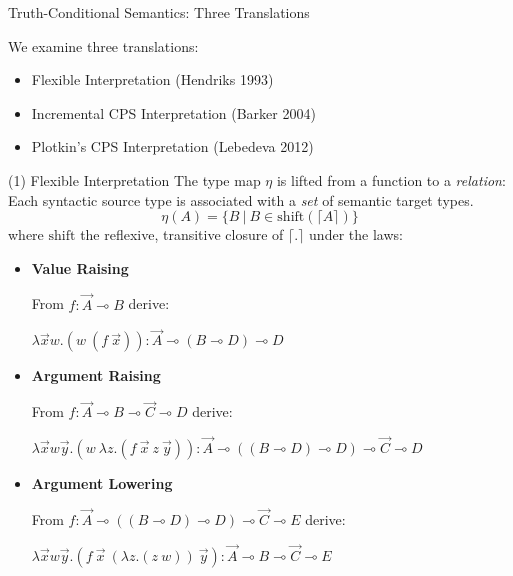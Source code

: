 \documentclass{beamer}
\newcommand{\li}{\!\multimap\!}
\newcommand{\trans}[1]{\lceil #1 \rceil}
\begin{document}
\begin{frame}{Truth-Conditional Semantics: Three Translations}
	
	We examine three translations:
	\begin{itemize}
	\item Flexible Interpretation (Hendriks 1993)
	\item Incremental CPS Interpretation (Barker 2004)
	\item Plotkin's CPS Interpretation (Lebedeva 2012)
	\end{itemize}
\end{frame}

\begin{frame}{(1) Flexible Interpretation}
	\small
	The type map $\eta$ is lifted from a function to a \textit{relation}:
	Each syntactic source type is associated with a \textit{set} of semantic target types.
	\[
		\eta(A) = \{ B \ | \ B \in \mathrm{shift}(\trans{A}) \}
	\]
	where $\mathrm{shift}$ the reflexive, transitive closure of $\trans{.}$ under the laws:
	\begin{itemize}
		\item \textbf{Value Raising}
			{\footnotesize
			\begin{flushleft}
			From $f: \vec{A}\li B$ derive:
			\end{flushleft}
			\begin{flushright}
			\vspace{-10pt}
			$\lambda \vec{x}w.(w \ (f \ \vec{x})): \vec{A} \li (B\li D) \li D$		
			\end{flushright}
			}
		\item \textbf{Argument Raising}
			{\footnotesize
			\begin{flushleft}
			From $f: \vec{A}\li B \li \vec{C}\li D$ derive:
			\end{flushleft}
			\begin{flushright}
			\vspace{-10pt}
			$\lambda \vec{x}w\vec{y}.(w \ \lambda z.(f \ \vec{x} \ z \ \vec{y})): \vec{A}\li ((B\li D)\li D) \li \vec{C} \li D$
			\end{flushright}
			}
		\item \textbf{Argument Lowering}
			{\footnotesize
			\begin{flushleft}
			 From $f: \vec{A} \li ((B\li D) \li D) \li \vec{C} \li E$ derive:		
			\end{flushleft}
			\begin{flushright}
			\vspace{-10pt}
			$\lambda \vec{x}w\vec{y}.(f \ \vec{x} \ (\lambda z. (z \ w))\ \vec{y}): \vec{A} \li B \li \vec{C} \li E$
			\end{flushright}
			}
	\end{itemize}
\end{frame}
\end{document}
